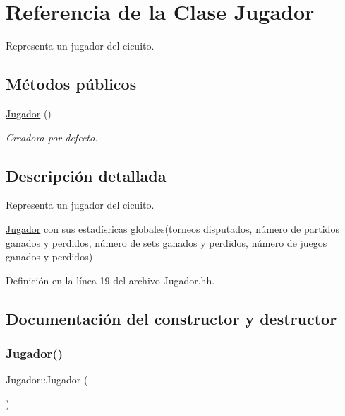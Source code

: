 \hypertarget{class_jugador}{}\section{Referencia de la Clase Jugador}
\label{class_jugador}


Representa un jugador del cicuito.  


\subsection*{Métodos públicos}
\begin{DoxyCompactItemize}
\item 
\hyperlink{class_jugador_a232c46f75691af6210096e5972535d71}{Jugador} ()
\begin{DoxyCompactList}\small\item\em Creadora por defecto. \end{DoxyCompactList}\end{DoxyCompactItemize}


\subsection{Descripción detallada}
Representa un jugador del cicuito. 

\hyperlink{class_jugador}{Jugador} con sus estadísricas globales(torneos disputados, número de partidos ganados y perdidos, número de sets ganados y perdidos, número de juegos ganados y perdidos) 

Definición en la línea 19 del archivo Jugador.\+hh.



\subsection{Documentación del constructor y destructor}
\mbox{\label{class_jugador_a232c46f75691af6210096e5972535d71}} 
\subsubsection{\texorpdfstring{Jugador()}{Jugador()}}
{\footnotesize\ttfamily Jugador\+::\+Jugador (\begin{DoxyParamCaption}{ }\end{DoxyParamCaption})}



